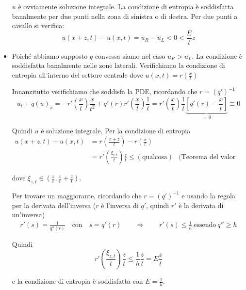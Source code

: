 \documentclass[10pt,a4paper,twoside,openright]{book}
\begin{document}
\begin{dimostrazione}
\begin{itemize}
\begin{figure}[H]
\begin{tikzpicture}[x=0.75pt,y=0.75pt,yscale=-1,xscale=1]
		\end{tikzpicture}
	\end{figure}
	\FloatBarrier


	$u$ è ovviamente soluzione integrale. La condizione di entropia è soddisfatta banalmente per due punti nella zona di sinistra o di destra. Per due punti a cavallo si verifica:
	\begin{equation*}
		u(x+z,t) -u(x,t) =u_{R} -u_{L} < 0< \frac{E}{t} z
	\end{equation*}
	\item Poiché abbiamo supposto $q$ convessa siamo nel caso $\displaystyle u_{R}  >u_{L}$. La condizione è soddisfatta banalmente nelle zone laterali. Verifichiamo la condizione di entropia all'interno del settore centrale dove $\displaystyle u(x,t) =r\left(\frac{x}{t}\right)$

	Innanzitutto verifichiamo che soddisfa la PDE, ricordando che $r=(q')^{-1}$
	\begin{equation*}
		u_{t} +q(u)_{x} =-r'\left(\frac{x}{t}\right)\frac{x}{t^{2}} +q'(r) r'\left(\frac{x}{t}\right)\frac{1}{t} =r'\left(\frac{x}{t}\right)\frac{1}{t}\underbrace{\left[ q'(r) -\frac{x}{t}\right]}_{=0} \equiv 0
	\end{equation*}

	Quindi $u$ è soluzione integrale. Per la condizione di entropia
	\begin{align*}
	u(x+z,t) -u(x,t) & =r\left(\frac{x+z}{t}\right) -r\left(\frac{x}{t}\right) & \\
	 & =r'\left(\frac{\xi _{z,t}}{t}\right)\frac{z}{t} \leqslant (\text{qualcosa}) & \text{(Teorema del valor medio)}
	\end{align*}

	dove $\displaystyle \xi _{z,t} \in \left(\frac{x}{t} ,\frac{x}{t} +\frac{z}{t}\right)$.

	Per trovare un maggiorante, ricordando che $\displaystyle r=(q')^{-1}$ e usando la regola per la derivata dell'inversa ($r$ è l'inversa di $q'$, quindi $r'$ è la derivata di un'inversa)
	\begin{gather*}
	r'(s) =\frac{1}{q''(r)} \quad \text{con} \quad s=q'(r) \qquad \Rightarrow \qquad r'(s) \leqslant \frac{1}{h} \ \text{essendo} \ q''\geqslant h
	\end{gather*}

	Quindi
	\begin{equation*}
		r'\left(\frac{\xi _{z,t}}{t}\right)\frac{z}{t} \leqslant \frac{1}{h}\frac{z}{t} = E \frac{z}{t}
	\end{equation*}

	e la condizione di entropia è soddisfatta con $\displaystyle E=\frac{1}{h}$.
\end{itemize}

\end{dimostrazione}
\end{document}
